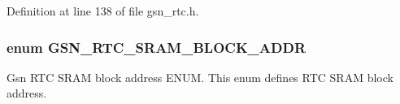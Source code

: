 Definition at line 138 of file gsn\_\-rtc.h.

\hypertarget{a00651_gaec3839be6e64287f1c0981aafc08548b}{
\subsubsection[{GSN\_\-RTC\_\-SRAM\_\-BLOCK\_\-ADDR}]{\setlength{\rightskip}{0pt plus 5cm}enum {\bf GSN\_\-RTC\_\-SRAM\_\-BLOCK\_\-ADDR}}}
\label{a00651_gaec3839be6e64287f1c0981aafc08548b}


Gsn RTC SRAM block address ENUM. This enum defines RTC SRAM block address. 

